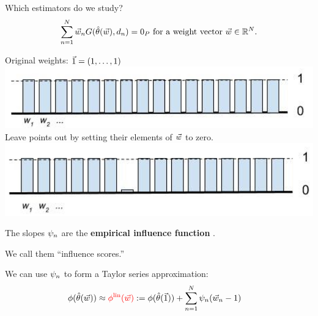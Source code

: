 \begin{frame}[t]{Which estimators do we study?}
\vspace{-2em}
\begin{align*}
%
\sumn \w_n
G(\thetahat(\w), \d_{n}) =  \zP
\textrm{ for a weight vector }\w \in \mathbb{R}^N.
%
\end{align*}
%
\begin{minipage}{0.45\textwidth}
\begin{center}
Original weights: $\vec{1} = (1,\ldots,1)$
    \includegraphics[width=1.0\textwidth]{static_figures/orig_weights}
Leave points out by setting their elements of $\vec{w}$ to zero.
    \includegraphics[width=1.0\textwidth]{static_figures/weights_loo}
\end{center}
\end{minipage}
\begin{minipage}{0.45\textwidth}
\LinearGraph{}
\end{minipage}

The slopes $\psi_n$ are the \textbf{empirical influence function}
\citep{hampel1986robustbook}.

We call them ``influence scores.''

\vspace{1em}
We can use $\psi_n$ to form a Taylor series approximation:
%
\begin{align*}
	\phi(\hat{\theta}(\vec{w}))
		&\approx
        \color{red}
        \phi^{\mathrm{lin}}(\vec{w})
        \color{black}
		:=  \phi(\hat{\theta}(\vec{1})) +
        \sum_{n=1}^N \psi_n (\vec{w}_n -1)
        \color{black}
\end{align*}

\end{frame}






